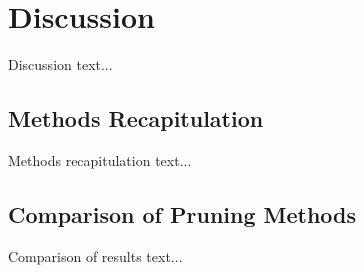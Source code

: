 \chapter{Discussion} \label{chap:discussion}
Discussion text...

\section{Methods Recapitulation} \label{sec:methods_recapitulation}
Methods recapitulation text...

\section{Comparison of Pruning Methods} \label{sec:comparison_of_pruning_methods}
Comparison of results text...
